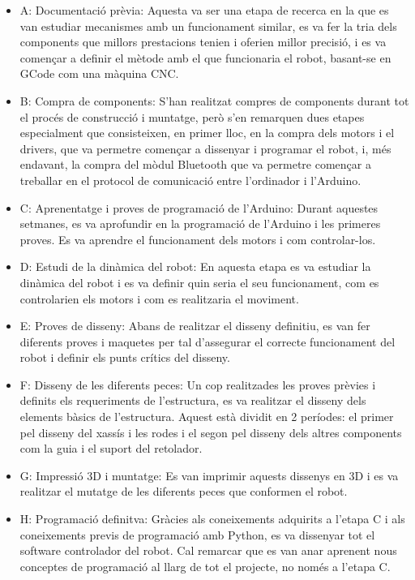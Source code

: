 \begin{itemize}
	\item A: Documentació prèvia: Aquesta va ser una etapa de recerca en la que es van estudiar mecanismes amb un funcionament similar, es va fer la tria dels components que millors prestacions tenien i oferien millor precisió, i es va començar a definir el mètode amb el que funcionaria el robot, basant-se en GCode com una màquina CNC.
	
	\item B: Compra de components: S'han realitzat compres de components durant tot el procés de construcció i muntatge, però s'en remarquen dues etapes especialment que consisteixen, en primer lloc, en la compra dels motors i el drivers, que va permetre començar a dissenyar i programar el robot, i, més endavant, la compra del mòdul Bluetooth que va permetre començar a treballar en el protocol de comunicació entre l'ordinador i l'Arduino. 
	 
	\item C: Aprenentatge i proves de programació de l'Arduino: Durant aquestes setmanes, es va aprofundir en la programació de l'Arduino i les primeres proves. Es va aprendre el funcionament dels motors i com controlar-los.
	
	\item D: Estudi de la dinàmica del robot: En aquesta etapa es va estudiar la dinàmica del robot i es va definir quin seria el seu funcionament, com es controlarien els motors i com es realitzaria el moviment. 
	 
	\item E: Proves de disseny: Abans de realitzar el disseny definitiu, es van fer diferents proves i maquetes per tal d'assegurar el correcte funcionament del robot i definir els punts crítics del disseny. 
	
	\item F: Disseny de les diferents peces: Un cop realitzades les proves prèvies i definits els requeriments de l'estructura, es va realitzar el disseny dels elements bàsics de l'estructura. Aquest està dividit en 2 períodes: el primer pel disseny del xassís i les rodes i el segon  pel disseny dels altres components com la guia i el suport del retolador.
	
	\item G: Impressió 3D i muntatge: Es van imprimir aquests dissenys en 3D i es va realitzar el mutatge de les diferents peces que conformen el robot. 
	
	\item H: Programació definitva: Gràcies als coneixements adquirits a l'etapa C i als coneixements previs de programació amb Python, es va dissenyar tot el software controlador del robot. Cal remarcar que es van anar aprenent nous conceptes de programació al llarg de tot el projecte, no només a l'etapa C.
	

\end{itemize}
